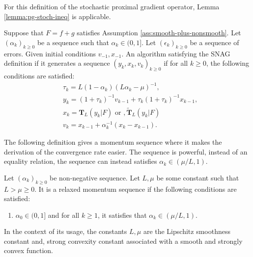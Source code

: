\documentclass[12pt]{article}
\begin{document}
    \begin{remark}
        For this definition of the stochastic proximal gradient operator, Lemma \ref{lemma:pg-stoch-ineq} is applicable. 
    \end{remark}
    \begin{definition}\label{def:SNAG}
        Suppose that $F = f + g$ satisfies Assumption \ref{ass:smooth-plus-nonsmooth}. 
        Let $(\alpha_k)_{k \ge 0}$ be a sequence such that $\alpha_k \in (0, 1]$. 
        Let $(\epsilon_k)_{k \ge 0}$ be a sequence of errors. 
        Given initial conditions $v_{-1}, x_{- 1}$. 
        An algorithm satisfying the SNAG definition if it generates a sequence $(y_k, x_k, v_k)_{k \ge 0}$ if for all $k \ge 0$, the following conditions are satisfied: 
        \begin{align*}
            & \tau_k = L(1 - \alpha_k)\left(L \alpha_k - \mu\right)^{-1}, \\
            & y_k = (1 + \tau_k)^{-1}v_{k - 1} + \tau_k(1 + \tau_k)^{-1}x_{k - 1}, \\
            & x_k =  \mathbf T_{L}(y_k | F) \text{ or }, \mathbf{\widetilde T}_L(y_k | F)\\
            & v_k = x_{k - 1} + \alpha_k^{-1}(x_k - x_{k - 1}).
        \end{align*}
    \end{definition}
    The following definition gives a momentum sequence where it makes the derivation of the convergence rate easier. 
    The sequence is powerful, instead of an equality relation, the sequence can instead satisfies $\alpha_k \in (\mu/L, 1)$. 
    \begin{definition}\label{def:relax-momen-seq}
        Let $(\alpha_k)_{k \ge 0}$ be non-negative sequence. 
        Let $L, \mu$ be some constant such that $L > \mu \ge 0$. 
        It is a relaxed momentum sequence if the following conditions are satisfied: 
        \begin{enumerate}[nosep]
            \item $\alpha_0 \in (0, 1]$ and for all $k \ge 1$, it satisfies that $\alpha_k \in (\mu/L, 1)$. 
        \end{enumerate}
    \end{definition}
    \begin{remark}
        In the context of its usage, the constants $L, \mu$ are the Lipschitz smoothness constant  and, strong convexity constant associated with a smooth and strongly convex function. 
    \end{remark}
\end{document}
